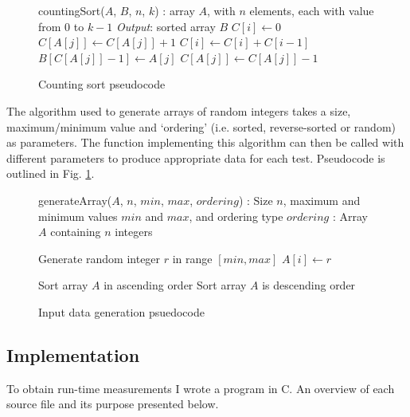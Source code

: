 \documentclass{article}
\begin{document}
\begin{figure}[H]
\begin{algorithmic}
 countingSort($A$, $B$, $n$, $k$)
: array $A$, with $n$ elements,
	each with value from $0$ to $k-1$
\STATE \emph{Output}: sorted array $B$
   \STATE $C[i] \leftarrow 0$
\ENDFOR
{}
   \STATE $C[A[j]] \leftarrow C[A[j]] + 1$
 \ENDFOR
   \STATE $C[i] \leftarrow C[i] + C[i-1]$
\ENDFOR
   \STATE $B[C[A[j]]-1] \leftarrow A[j]$
   \STATE $C[A[j]] \leftarrow C [A[j]] - 1$
\ENDFOR
\end{algorithmic}
\caption{Counting sort pseudocode}
\end{figure}

The algorithm used to generate arrays of random integers takes a size, maximum/minimum value and `ordering' (i.e. sorted, reverse-sorted or random) as parameters. The function implementing this algorithm can then be called with different parameters to produce appropriate data for each test. Pseudocode is outlined in Fig. \ref{data-gen-alg}.

\begin{figure}[H]
\begin{algorithmic}
 generateArray($A$, $n$, $min$, $max$, $ordering$)
: Size $n$, maximum and minimum values $min$ and $max$, and ordering type $ordering$
: Array $A$ containing $n$ integers

	\STATE Generate random integer $r$ in range $[min, max]$
	\STATE $A[i] \leftarrow r$
\ENDFOR

	\STATE Sort array $A$ in ascending order
	\STATE Sort array $A$ is descending order
\ENDIF

\end{algorithmic}
\caption{Input data generation psuedocode}
\label{data-gen-alg}
\end{figure}

\subsection{Implementation}
To obtain run-time measurements I wrote a program in C. An overview of each source file and its purpose presented below.
\end{document}
